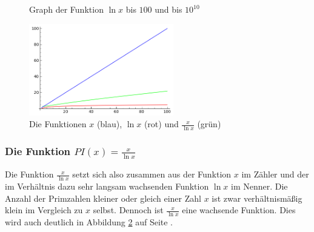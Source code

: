 \begin{refsegment}
\begin{figure}[!htb]
	\centering
	\hfill
	\caption{Graph der Funktion $\ln{x}$ bis $100$ und bis $10^{10}$}
	\label{lnxbis}
\end{figure}

\begin{figure}[!htb]
	\centering
	\includegraphics[height=4cm]{figures/xundlnxundxdurchlnx.png}
	\caption{Die Funktionen $x$ (blau), $\ln{x}$ (rot)
                 und $\frac{x}{\ln{x}}$ (grün)}
	\label{xundlnxundxdurchlnx}
\end{figure}


\subsubsection*{Die Funktion $PI(x) = \frac{x}{\ln{x}}$}
Die Funktion $\frac{x}{\ln{x}}$ setzt sich also zusammen aus der Funktion $x$ im Zähler und der im Verhältnis dazu sehr langsam wachsenden Funktion $\ln{x}$ im Nenner. Die Anzahl der Primzahlen kleiner oder gleich einer Zahl $x$ ist zwar verhältnismäßig klein im Vergleich zu $x$ selbst. Dennoch ist $\frac{x}{\ln{x}}$ eine wachsende Funktion. Dies wird auch deutlich in Abbildung \ref{xundlnxundxdurchlnx} auf Seite \pageref{xundlnxundxdurchlnx}.



\end{refsegment}
